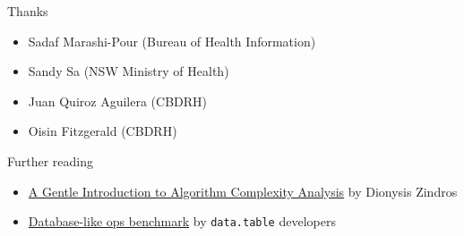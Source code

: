 \documentclass[aspectratio=169,12pt,usepdftitle=false]{beamer} %
\begin{document}
%
%
%
%










\begin{frame}{Thanks}
    \begin{itemize}
        \item Sadaf Marashi-Pour (Bureau of Health Information)
	\item Sandy Sa (NSW Ministry of Health)
	\item Juan Quiroz Aguilera (CBDRH)
	\item Oisin Fitzgerald (CBDRH)
    \end{itemize}
\end{frame}

\begin{frame}{Further reading}
    \begin{itemize}
	\item \href{https://discrete.gr/complexity/}{A Gentle Introduction to Algorithm Complexity Analysis} by Dionysis Zindros
	\item \href{https://h2oai.github.io/db-benchmark/}{Database-like ops benchmark} by \texttt{data.table} developers
    \end{itemize}
\end{frame}
\end{document}
